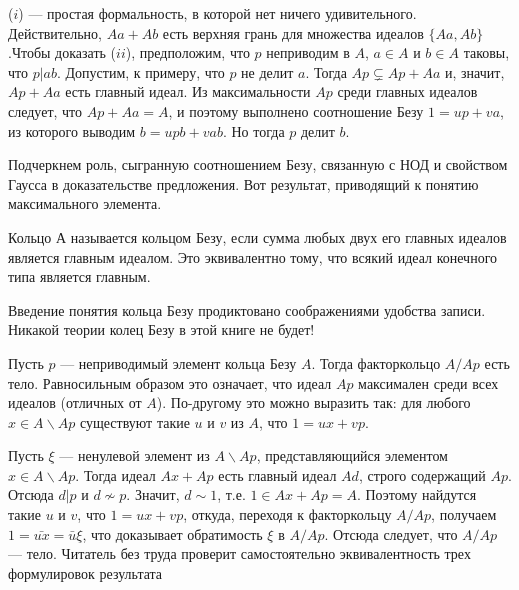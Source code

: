 \documentclass{../../template/mai_book}
\begin{document}
\begin{myproof}
($i$) — простая формальность, в которой нет ничего удивительного. Действительно, $Aa + Ab$ есть верхняя грань для множества идеалов \newline $\{Aa, Ab\}$.\newline \newline Чтобы доказать ($ii$), предположим, что $p$ неприводим в $A$, $a \in A$ и $b \in A$ таковы, что $p | ab$. Допустим, к примеру, что $p$ не делит $a$. Тогда $Ap \varsubsetneq Ap + Aa$ и, значит, $Ap + Aa$ есть главный идеал. Из максимальности $Ap$ среди главных идеалов следует, что $Ap + Aa = A$, и поэтому выполнено соотношение Безу $1 = up + va$, из которого выводим $b = upb + vab$. Но тогда $p$ делит $b$.
\end{myproof}

\indent Подчеркнем роль, сыгранную соотношением Безу, связанную с НОД и свойством Гаусса в доказательстве предложения. Вот результат, приводящий к понятию максимального элемента.


\newpage
\begin{determ}
\textit{\indent} Кольцо А называется кольцом Безу, если сумма любых двух его главных идеалов является главным идеалом. Это эквивалентно тому, что всякий идеал конечного типа является главным.
\end{determ}

\begin{mynotice}
Введение понятия кольца Безу продиктовано соображениями удобства записи. Никакой теории колец Безу в этой книге не будет!
\end{mynotice}

\begin{predl}
Пусть $p$ — неприводимый элемент кольца Безу $A$. Тогда факторкольцо $A/Ap$ есть тело. Равносильным образом это означает, что идеал $Ap$ максимален среди всех идеалов (отличных от $A$). По-другому это можно выразить так: для любого $x \in A\backslash Ap$ существуют такие $u$ и $v$ из $A$, что $1 = ux + vp$.
\end{predl}

\begin{myproof}
Пусть $\xi$ — ненулевой элемент из $A\backslash Ap$, представляющийся элементом $x \in A\backslash Ap$. Тогда идеал $Ax + Ap$ есть главный идеал $Ad$, строго содержащий $Ap$. Отсюда $d | p$ и $d \nsim p$. Значит, $d \sim 1$, т.е. $1 \in Ax + Ap = A$. Поэтому найдутся такие $u$ и $v$, что $1 = ux + vp$, откуда, переходя к факторкольцу $A/Ap$, получаем $1 = \bar{ux} = \bar{u}\xi$, что доказывает обратимость $\xi$ в $A/Ap$. Отсюда следует, что $A/Ap$ — тело. \newline Читатель без труда проверит самостоятельно эквивалентность трех формулировок результата
\end{myproof}
\end{document}
